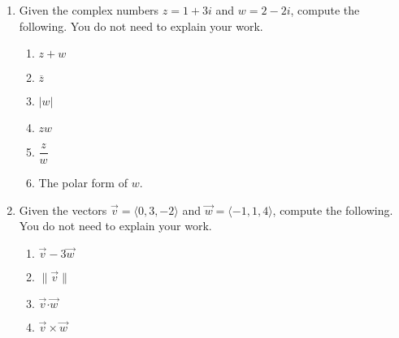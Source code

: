 \documentclass[12pt]{article}
\newcommand{\points}[1]{\marginpar{\hspace{24pt}[#1]}}
\newcommand{\dotp}{\boldsymbol{\cdot}}
\newcommand{\abs}[1]{\lvert #1\rvert}
\newcommand{\len}[1]{\lVert #1\rVert}
\begin{document}
\begin{enumerate}
\item Given the complex numbers $z=1+3i$ and $w=2-2i$, compute the following. You do not need to explain your work.
 \begin{enumerate}
\item $z+w$ \points{2}

\vspace{1in}

\item $\overline{z}$ \points{2}

\vspace{0.75in}

\item $\abs{w}$ \points{2}

\vspace{1in}

\item $zw$ \points{2}

\vspace{1.25in}

\item $\dfrac{z}{w}$ \points{3}

\vspace{1.5in}

\item The polar form of $w$. \points{3}
\end{enumerate}

\newpage

\item Given the vectors $\vec{v} = \langle 0, 3, -2\rangle$ and $\vec{w} = \langle -1, 1, 4\rangle$, compute the following. You do not need to explain your work.
\begin{enumerate}
 \item $\vec{v}-3\vec{w}$  \points{2}

\vspace{1in}
  
 \item $\len{\vec{v}}$ \points{2}

\vspace{1in}

 \item $\vec{v}\dotp\vec{w}$ \points{2}

\vspace{1in}

 \item $\vec{v}\times \vec{w}$ \points{4}

\vspace{2in}


\end{enumerate}
\end{enumerate}
\end{document}
